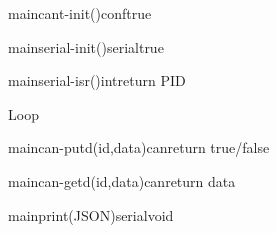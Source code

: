 \begin {sequencediagram}

 


\begin{call}{main}{cant-init()}{conf}{true}
\end{call}
\begin{call}{main}{serial-init()}{serial}{true}
\end{call}
\begin{call}{main}{serial-isr()}{int}{return PID}
\end{call}


\begin{sdblock}[blue!10]{Loop}{}
	

	\begin{call}[2]{main}{can-putd(id,data)}{can}{return true/false}
	\end{call}


	\begin{call}[2]{main}{can-getd(id,data)}{can}{return data}
	\end{call}
	
    
    \begin{call}[2]{main}{print(JSON)}{serial}{void}
	\end{call}
    
    
	\end{sdblock}
\end {sequencediagram}